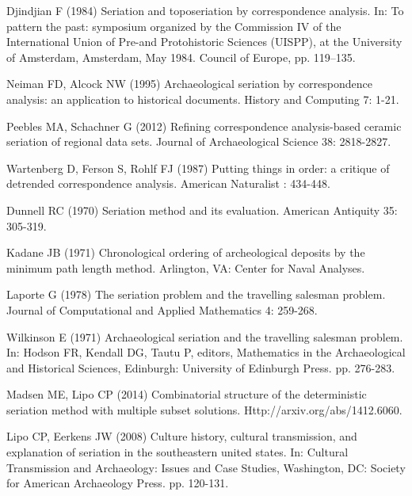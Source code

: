 \documentclass[10pt,letterpaper]{article}
\begin{document}
\begin{thebibliography}{10}
Djindjian F (1984) Seriation and toposeriation by correspondence analysis.
\newblock In: To pattern the past: symposium organized by the Commission IV of
  the International Union of Pre-and Protohistoric Sciences (UISPP), at the
  University of Amsterdam, Amsterdam, May 1984. Council of Europe, pp.
  119--135.

Neiman FD, Alcock NW (1995) Archaeological seriation by correspondence
  analysis: an application to historical documents.
\newblock History and Computing 7: 1-21.

Peebles MA, Schachner G (2012) Refining correspondence analysis-based ceramic
  seriation of regional data sets.
\newblock Journal of Archaeological Science 38: 2818-2827.

Wartenberg D, Ferson S, Rohlf FJ (1987) Putting things in order: a critique of
  detrended correspondence analysis.
\newblock American Naturalist : 434-448.

Dunnell RC (1970) Seriation method and its evaluation.
\newblock American Antiquity 35: 305-319.

Kadane JB (1971) Chronological ordering of archeological deposits by the
  minimum path length method.
\newblock Arlington, VA: Center for Naval Analyses.

Laporte G (1978) The seriation problem and the travelling salesman problem.
\newblock Journal of Computational and Applied Mathematics 4: 259-268.

Wilkinson E (1971) Archaeological seriation and the travelling salesman
  problem.
\newblock In: Hodson FR, Kendall DG, Tautu P, editors, Mathematics in the
  Archaeological and Historical Sciences, Edinburgh: University of Edinburgh
  Press. pp. 276-283.

Madsen ME, Lipo CP (2014) Combinatorial structure of the deterministic
  seriation method with multiple subset solutions.
\newblock Http://arxiv.org/abs/1412.6060.

Lipo CP, Eerkens JW (2008) Culture history, cultural transmission, and
  explanation of seriation in the southeastern united states.
\newblock In: Cultural Transmission and Archaeology: Issues and Case Studies,
  Washington, DC: Society for American Archaeology Press. pp. 120-131.


\end{thebibliography}
\end{document}
